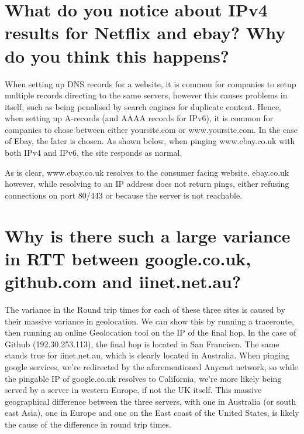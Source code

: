 \section{What do you notice about IPv4 results for Netflix and ebay? Why do you think this happens?}
\begin{normalsize}
When setting up DNS records for a website, it is common for companies to setup multiple records directing to the same servers, however this causes problems in itself, such as being penalised by search engines for duplicate content. Hence, when setting up A-records (and AAAA records for IPv6), it is common for companies to chose between either yoursite.com or www.yoursite.com. In the case of Ebay, the later is chosen. As shown below, when pinging www.ebay.co.uk with both IPv4 and IPv6, the site responds as normal. 
\end{normalsize}

\begin{normalsize}
As is clear, www.ebay.co.uk resolves to the consumer facing website. ebay.co.uk however, while resolving to an IP address does not return pings, either refusing connections on port 80/443 or because the server is not reachable.
\end{normalsize}
\newpage
\section{Why is there such a large variance in RTT between google.co.uk, github.com and iinet.net.au?}
\begin{normalsize}
The variance in the Round trip times for each of these three sites is caused by their massive variance in geolocation. We can show this by running a traceroute, then running an online Geolocation tool on the IP of the ﬁnal hop. In the case of Github (192.30.253.113), the ﬁnal hop is located in San Francisco. The same stands true for iinet.net.au, which is clearly located in Australia. When pinging google services, we’re redirected by the aforementioned Anycast network, so while the pingable IP of google.co.uk resolves to California, we’re more likely being served by a server in western Europe, if not the UK itself. This massive geographical diﬀerence between the three servers, with one in Australia (or south east Asia), one in Europe and one on the East coast of the United States, is likely the cause of the diﬀerence in round trip times.
\end{normalsize}